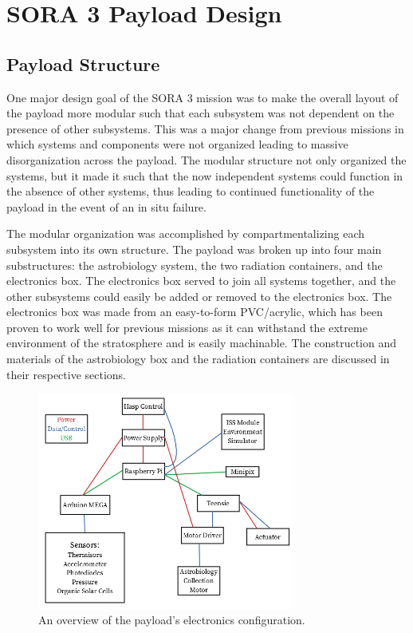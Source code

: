 \section{SORA 3 Payload Design}
\label{sec:Design}

\subsection{Payload Structure}
One major design goal of the SORA 3 mission was to make the overall layout of the payload more modular such that each subsystem was not dependent on the presence of other subsystems.
This was a major change from previous missions in which systems and components were not organized leading to massive disorganization across the payload.
The modular structure not only organized the systems, but it made it such that the now independent systems could function in the absence of other systems, thus leading to continued functionality of the payload in the event of an in situ failure.

The modular organization was accomplished by compartmentalizing each subsystem into its own structure.
The payload was broken up into four main substructures: the astrobiology system, the two radiation containers, and the electronics box.
The electronics box served to join all systems together, and the other subsystems could easily be added or removed to the electronics box.
The electronics box was made from an easy-to-form PVC/acrylic, which has been proven to work well for previous missions as it can withstand the extreme environment of the stratosphere and is easily machinable.
The construction and materials of the astrobiology box and the radiation containers are discussed in their respective sections.


\begin{figure}[h!]
	\begin{center}
		\includegraphics[width=0.75\textwidth]{figures/sys_overview.png}
		\caption{An overview of the payload's electronics configuration.}
		\label{fig:sys_overview}
	\end{center}
\end{figure}
